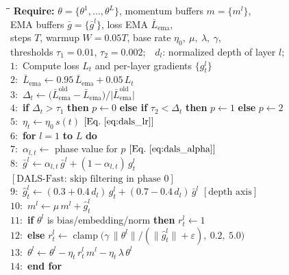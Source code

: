 \documentclass[a4paper,fleqn]{cas-dc}
\begin{document}
\begin{algorithm}[h]
\footnotesize
\begin{tabbing}
\hspace{3.2em}\=\hspace{2.2em}\=\hspace{1.6em}\=\kill
\textbf{Require:} \> $\theta=\{\theta^1,\ldots,\theta^L\}$, momentum buffers $m=\{m^l\}$,\\
\> EMA buffers $\bar g=\{\bar g^l\}$, loss EMA $\bar L_{\mathrm{ema}}$,\\
\> steps $T$, warmup $W=0.05T$, base rate $\eta_0,\ \mu,\ \lambda,\ \gamma$,\\
\> thresholds $\tau_1=0.01$, $\tau_2=0.002$;\ \ $d_l$: normalized depth of layer $l$;\\
$1{:}$ \> Compute loss $L_t$ and per-layer gradients $\{g_t^l\}$\\
$2{:}$ \> $\bar L_{\mathrm{ema}}\gets 0.95\,\bar L_{\mathrm{ema}}+0.05\,L_t$\\
$3{:}$ \> $\Delta_t\gets\big(\bar L_{\mathrm{ema}}^{\mathrm{old}}-\bar L_{\mathrm{ema}}\big)/\big|\bar L_{\mathrm{ema}}^{\mathrm{old}}\big|$\\
$4{:}$ \> \textbf{if} $\Delta_t>\tau_1$ \textbf{then} $p\gets0$ \textbf{else if} $\tau_2<\Delta_t$ \textbf{then} $p\gets1$ \textbf{else} $p\gets2$\\
$5{:}$ \> $\eta_t\gets\eta_0\,s(t)$ \quad $[\text{Eq.}~\eqref{eq:dals_lr}]$\\
$6{:}$ \> \textbf{for} $l=1$ \textbf{to} $L$ \textbf{do}\\
$7{:}$ \> \> $\alpha_{l,t}\gets$ phase value for $p$ \quad $[\text{Eq.}~\eqref{eq:dals_alpha}]$\\
$8{:}$ \> \> $\bar g^l\gets\alpha_{l,t}\,\bar g^l+(1-\alpha_{l,t})\,g_t^l$\\
\> \> \> \quad $[\text{DALS-Fast: skip filtering in phase }0]$\\
$9{:}$ \> \> $\hat g_t^l\gets(0.3+0.4\,d_l)\,g_t^l+(0.7-0.4\,d_l)\,\bar g^l$ \quad $[\text{depth axis}]$\\
$10{:}$ \> \> $m^l\gets\mu\,m^l+\hat g_t^l$\\
$11{:}$ \> \> \textbf{if} $\theta^l$ is bias/embedding/norm \textbf{then} $r_t^l\gets1$\\
$12{:}$ \> \> \textbf{else} $r_t^l\gets\operatorname{clamp}\!\big(\gamma\,\|\theta^l\|/(\|\hat g_t^l\|+\varepsilon),\ 0.2,\ 5.0\big)$\\
$13{:}$ \> \> $\theta^l\gets\theta^l-\eta_t\,r_t^l\,m^l-\eta_t\,\lambda\,\theta^l$\\
$14{:}$ \> \textbf{end for}\\
\end{tabbing}
\caption{Complete DALS pseudocode for one training step.}\label{alg:dals}
\end{algorithm}
\end{document}
